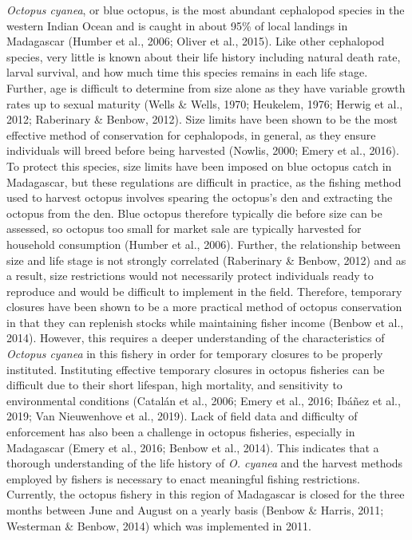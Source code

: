 \documentclass[
  12pt,
]{article}
\begin{document}
\emph{Octopus cyanea}, or blue octopus, is the most abundant cephalopod species in the western Indian Ocean and is caught in about 95\% of local landings in Madagascar (Humber et al., 2006; Oliver et al., 2015). Like other cephalopod species, very little is known about their life history including natural death rate, larval survival, and how much time this species remains in each life stage. Further, age is difficult to determine from size alone as they have variable growth rates up to sexual maturity (Wells \& Wells, 1970; Heukelem, 1976; Herwig et al., 2012; Raberinary \& Benbow, 2012). Size limits have been shown to be the most effective method of conservation for cephalopods, in general, as they ensure individuals will breed before being harvested (Nowlis, 2000; Emery et al., 2016). To protect this species, size limits have been imposed on blue octopus catch in Madagascar, but these regulations are difficult in practice, as the fishing method used to harvest octopus involves spearing the octopus's den and extracting the octopus from the den. Blue octopus therefore typically die before size can be assessed, so octopus too small for market sale are typically harvested for household consumption (Humber et al., 2006). Further, the relationship between size and life stage is not strongly correlated (Raberinary \& Benbow, 2012) and as a result, size restrictions would not necessarily protect individuals ready to reproduce and would be difficult to implement in the field. Therefore, temporary closures have been shown to be a more practical method of octopus conservation in that they can replenish stocks while maintaining fisher income (Benbow et al., 2014). However, this requires a deeper understanding of the characteristics of \emph{Octopus cyanea} in this fishery in order for temporary closures to be properly instituted. Instituting effective temporary closures in octopus fisheries can be difficult due to their short lifespan, high mortality, and sensitivity to environmental conditions (Catalán et al., 2006; Emery et al., 2016; Ibáñez et al., 2019; Van Nieuwenhove et al., 2019). Lack of field data and difficulty of enforcement has also been a challenge in octopus fisheries, especially in Madagascar (Emery et al., 2016; Benbow et al., 2014). This indicates that a thorough understanding of the life history of \emph{O. cyanea} and the harvest methods employed by fishers is necessary to enact meaningful fishing restrictions. Currently, the octopus fishery in this region of Madagascar is closed for the three months between June and August on a yearly basis (Benbow \& Harris, 2011; Westerman \& Benbow, 2014) which was implemented in 2011.
\end{document}
